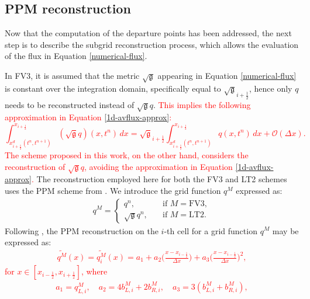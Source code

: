 \documentclass[preprint,12pt]{elsarticle}
\begin{document}
\begin{linenumbers}
\subsection{PPM reconstruction}
\label{ppm-recon}
Now that the computation of the departure points has been addressed, the next step is to describe the subgrid reconstruction process, which allows the evaluation of the flux in Equation \eqref{numerical-flux}.

In FV3, it is assumed that the metric $\sqrt{\mathfrak{g}}$ appearing in Equation \eqref{numerical-flux} is constant over the integration domain, specifically equal to $\sqrt{\mathfrak{g}}_{i+\frac{1}{2}}$, hence only $q$ needs to be reconstructed instead of $\sqrt{\mathfrak{g}}q$.
\textcolor{red}{ This implies the following approximation in Equation \eqref{1d-avflux-approx}:
\begin{equation}
	\label{1d-avflux-approx}
	\int^{x_{i+\frac{1}{2}}}_{ x_{i+\frac{1}{2}}^d(t^n,t^{n+1})} (\sqrt{\mathfrak{g}}q)(x,t^n)\,dx = 
	\sqrt{\mathfrak{g}}_{i+\frac{1}{2}}
	\int^{x_{i+\frac{1}{2}}}_{ x_{i+\frac{1}{2}}^d(t^n,t^{n+1})} q(x,t^n)\,dx + \mathcal{O}(\Delta x).
\end{equation}
The scheme proposed in this work, on the other hand, considers the reconstruction of $\sqrt{\mathfrak{g}}q$, avoiding the approximation in Equation \eqref{1d-avflux-approx}.}
The reconstruction employed here for both the FV3 and LT2 schemes uses the PPM scheme from \cite{colella:1984,carpenter:1990}.
We introduce the grid function $q^M$ expressed as:
\begin{align}
	\label{ppm_q_m}
    q^M = 
	\begin{cases}
        q^n,
		\quad &\text{if }{M=\text{FV3}},\\
        \sqrt{\mathfrak{g}}q^n,
		\quad &\text{if }{M=\text{LT2}}.
	\end{cases}
\end{align}
Following \cite{harris:2021}, the PPM reconstruction on the $i$-th cell for a grid function $q^M$ may be expressed as: \textcolor{red}{
\begin{align}
	\label{ppm-formula}
	\widetilde{q^M}(x) =
	\widetilde{q^M_i}(x) =
	a_1+ a_2
	\bigg(\frac{x-x_{i-\frac{1}{2}}}{\Delta x}\bigg)+
	a_3
	\bigg(\frac{x-x_{i-\frac{1}{2}}}{\Delta x}\bigg)^2,
\end{align}
for $x \in [x_{i-\frac{1}{2}},x_{i+\frac{1}{2}}]$, where
\begin{align}
	a_1 = q_{L,i}^M , \quad
	a_2 = 4b_{L,i}^M +2b_{R,i}^M, \quad
	a_3 = 3(b_{L,i}^M +b_{R,i}^M ) , 

\end{align}}
\end{linenumbers}
\end{document}
